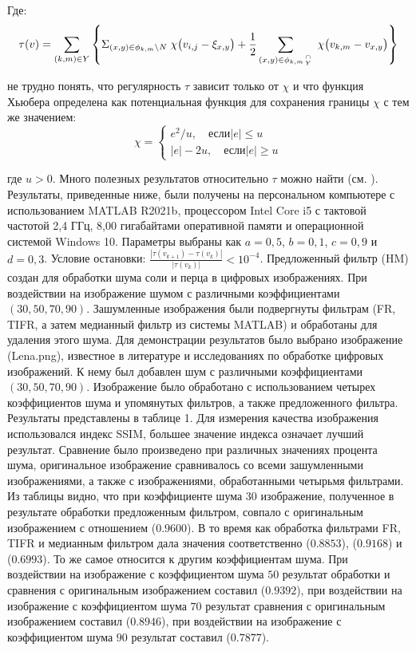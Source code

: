\noindent Где:
\begin{equation*}
    \tau(v)=\sum_{(k,m)\in Y}\left\{\Sigma_{(x,y)\in\phi_{k,m}\backslash{N}}\;\chi\bigl(v_{i,j}-\xi_{x,y}\bigr)+\frac{1}{2}\sum_{(x,y)\in\phi_{k,m}\stackover{\cap}{Y}}\;\chi\bigl(v_{k,m}-v_{x,y}\bigr)\right\}
\end{equation*}

\noindent не трудно понять, что регулярность $\tau$ зависит только от $\chi$ и
что функция Хьюбера определена как потенциальная функция для сохранения границы
$\chi$ с тем же значением:
\begin{equation*}
    \chi = \begin{cases} 
        e^{2}/u, \quad \text{если} |e|\leq u \\ 
        |e|-2u, \quad \text{если} |e| \ge u
    \end{cases}
\end{equation*}

\noindent где $u > 0$. Много полезных результатов относительно $\tau$ можно
найти (см. \cite{art24,art25,art26}). Результаты, приведенные ниже, были
получены на персональном компьютере с использованием MATLAB R2021b, процессором
Intel Core i5 с тактовой частотой 2,4 ГГц, 8,00 гигабайтами оперативной памяти и
операционной системой Windows 10. Параметры выбраны как $a = 0,5$, $b = 0,1$, $c
= 0,9$ и $d = 0,3$. Условие остановки:
${\frac{|\tau(v_{k+1})-\tau(v_{k})|}{|\tau(v_{k})|}}<10^{-4}$. Предложенный
фильтр (HM) создан для обработки шума соли и перца в цифровых изображениях. При
воздействии на изображение шумом с различными коэффициентами
$\left(30,50,70,90\right)$. Зашумленные изображения были подвергнуты фильтрам
(FR, TIFR, а затем медианный фильтр из системы MATLAB) и обработаны для удаления
этого шума. Для демонстрации результатов было выбрано изображение (Lena.png),
известное в литературе и исследованиях по обработке цифровых изображений. К нему
был добавлен шум с различными коэффициентами $\left(30,50,70,90\right)$.
Изображение было обработано с использованием четырех коэффициентов шума и
упомянутых фильтров, а также предложенного фильтра. Результаты представлены в
таблице 1. Для измерения качества изображения использовался индекс SSIM, большее
значение индекса означает лучший результат. Сравнение было произведено при
различных значениях процента шума, оригинальное изображение сравнивалось со
всеми зашумленными изображениями, а также с изображениями, обработанными
четырьмя фильтрами. Из таблицы видно, что при коэффициенте шума $30$
изображение, полученное в результате обработки предложенным фильтром, совпало с
оригинальным изображением с отношением ($0.9600$). В то время как обработка фильтрами FR,
TIFR и медианным фильтром дала значения соответственно ($0.8853$), ($0.9168$) и
($0.6993$). То же самое относится к другим коэффициентам шума. При воздействии на
изображение с коэффициентом шума $50$ результат обработки и сравнения с
оригинальным изображением составил ($0.9392$), при воздействии на изображение с
коэффициентом шума $70$ результат сравнения с оригинальным изображением составил
($0.8946$), при воздействии на изображение с коэффициентом шума $90$ результат
составил ($0.7877$).

